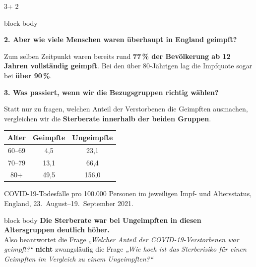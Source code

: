 \documentclass{beamer}
\begin{document}
\begin{frame}[t]
\begin{textblock*}{3\colwidth + 2\colsep}
\begin{alertblock}
\begin{minipage}{\textwidth}
\begin{beamercolorbox}[
			ht = 7cm, 
			wd = \linewidth, 
			left
		]{block body}
\vspace{0.7cm}

\textbf{\large 2. Aber wie viele Menschen waren überhaupt in England geimpft?}

		\end{beamercolorbox}
	\end{minipage}%

\vspace{0.35cm}

\begin{minipage}{0.92\linewidth}
    \centering
    \large
    Zum selben Zeitpunkt waren bereits rund
    \textbf{77\,\% der Bevölkerung ab 12 Jahren vollständig geimpft}.
    Bei den über 80-Jährigen lag die Impfquote sogar bei
    \textbf{über 90\,\%}.
    \cite{PHE2021}
\end{minipage}

\vspace{0.7cm}
\textbf{\large 3. Was passiert, wenn wir die Bezugsgruppen richtig wählen?}

\vspace{0.35cm}
\begin{minipage}{0.92\linewidth}
    \centering
    \large
    Statt nur zu fragen, welchen Anteil der Verstorbenen
    die Geimpften ausmachen, vergleichen wir die
    \textbf{Sterberate innerhalb der beiden Gruppen}.
\end{minipage}
\begin{center}
    \renewcommand{\arraystretch}{1.25}
    \begin{tabular}{c|c|c}
        \textbf{Alter} &
        \textbf{Geimpfte} &
        \textbf{Ungeimpfte} \\ \hline
        60--69 & 4,5 & 23,1 \\
        70--79 & 13,1 & 66,4 \\
        80+    & 49,5 & 156,0
    \end{tabular}
\end{center}

\vspace{0.15cm}

\begin{minipage}{0.92\linewidth}
    \centering
    \small
    COVID-19-Todesfälle pro 100.000 Personen im jeweiligen
    Impf- und Altersstatus, England, 23.~August--19.~September 2021.
    \cite{PHE2021}
\end{minipage}
\vspace{0.25cm}

\begin{beamercolorbox}[
    wd=0.88\linewidth,
    sep=0.25cm,
    center
]{block body}
    \centering
    \textbf{\large Die Sterberate war bei Ungeimpften
    in diesen Altersgruppen deutlich höher.} \\
	Also beantwortet die Frage \textit{„Welcher Anteil der COVID-19-Verstorbenen
    war geimpft?“} \textbf{nicht} zwangsläufig die Frage \textit{„Wie hoch ist das Sterberisiko für einen Geimpften
    im Vergleich zu einem Ungeimpften?“}


\end{beamercolorbox}
\end{alertblock}
\end{textblock*}
\end{frame}
\end{document}

